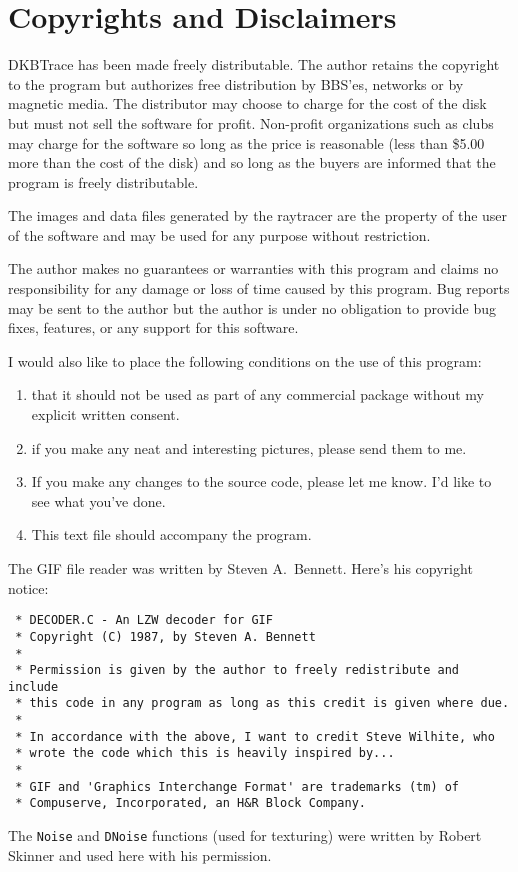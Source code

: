 \chapter{Copyrights and Disclaimers}

DKBTrace has been made freely distributable.  The author retains the
copyright to the program but authorizes free distribution by BBS'es,
networks or by magnetic media.  The distributor may choose to charge
for the cost of the disk but must not sell the software for profit.
Non-profit organizations such as clubs may charge for the software so
long as the price is reasonable (less than \$5.00 more than the cost of
the disk) and so long as the buyers are informed that the program is
freely distributable. 

The images and data files generated by the raytracer are the property
of the user of the software and may be used for any purpose without
restriction. 

The author makes no guarantees or warranties with this program and
claims no responsibility for any damage or loss of time caused by this
program. Bug reports may be sent to the author but the author is under
no obligation to provide bug fixes, features, or any support for this
software. 

I would also like to place the following conditions on the use of this program:
\begin{enumerate}
\item that it should not be used as part of any commercial package without my
explicit written consent.
\item if you make any neat and interesting pictures, please send them to me.
\item If you make any changes to the source code, please let me know. I'd like
to see what you've done.
\item This text file should accompany the program.
\end{enumerate}

The GIF file reader was written by
Steven A.\ Bennett.  Here's his copyright notice:
{\footnotesize
\begin{verbatim}
 * DECODER.C - An LZW decoder for GIF
 * Copyright (C) 1987, by Steven A. Bennett
 *
 * Permission is given by the author to freely redistribute and include
 * this code in any program as long as this credit is given where due.
 *
 * In accordance with the above, I want to credit Steve Wilhite, who
 * wrote the code which this is heavily inspired by...
 *
 * GIF and 'Graphics Interchange Format' are trademarks (tm) of
 * Compuserve, Incorporated, an H&R Block Company.
\end{verbatim}
}

The {\tt Noise} and {\tt DNoise} functions (used for texturing) were
written by Robert Skinner and used here with
his permission.
